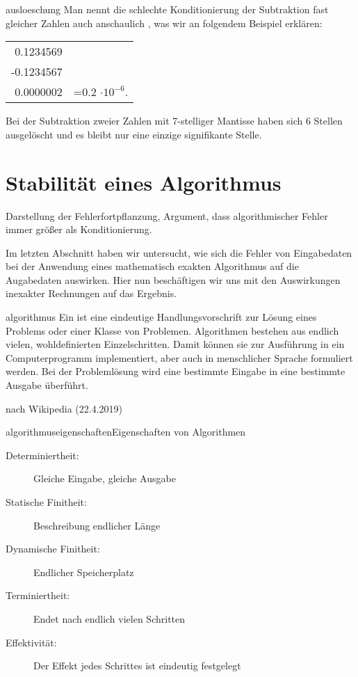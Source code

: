 \begin{Bemerkung}{ausloeschung}
  Man nennt die schlechte Konditionierung der Subtraktion fast
  gleicher Zahlen auch anschaulich , was wir an
  folgendem Beispiel erklären:
  \begin{center}
    \begin{tabular}{r@{}l}
      0.1234569&\\
      -0.1234567&\\\hline
      0.0000002&=0.2 $\cdot 10^{-6}$.
    \end{tabular}
  \end{center}
  Bei der Subtraktion zweier Zahlen mit 7-stelliger Mantisse haben
  sich 6 Stellen ausgelöscht und es bleibt nur eine einzige
  signifikante Stelle.
\end{Bemerkung}

\section{Stabilität eines Algorithmus}

\begin{todo}
  Darstellung der Fehlerfortpflanzung, Argument, dass algorithmischer
  Fehler immer größer als Konditionierung.
\end{todo}
\begin{intro}
  Im letzten Abschnitt haben wir untersucht, wie sich die Fehler von
  Eingabedaten bei der Anwendung eines mathematisch exakten
  Algorithmus auf die Augabedaten auswirken. Hier nun beschäftigen wir
  uns mit den Auswirkungen inexakter Rechnungen auf das Ergebnis.
\end{intro}

\begin{Definition}{algorithmus}
  Ein  ist eine eindeutige Handlungsvorschrift zur Lösung
  eines Problems oder einer Klasse von Problemen. Algorithmen bestehen
  aus endlich vielen, wohldefinierten Einzelschritten. Damit können
  sie zur Ausführung in ein Computerprogramm implementiert, aber auch
  in menschlicher Sprache formuliert werden. Bei der Problemlösung
  wird eine bestimmte Eingabe in eine bestimmte Ausgabe überführt.

  \hfill nach Wikipedia (22.4.2019)
\end{Definition}

\begin{Bemerkung*}{algorithmuseigenschaften}{Eigenschaften von Algorithmen}
  \begin{description}
  \item[Determiniertheit:] Gleiche Eingabe, gleiche Ausgabe
  \item[Statische Finitheit:] Beschreibung endlicher Länge
  \item[Dynamische Finitheit:] Endlicher Speicherplatz
  \item[Terminiertheit:] Endet nach endlich vielen Schritten
  \item[Effektivität:] Der Effekt jedes Schrittes ist eindeutig festgelegt
  \end{description}
\end{Bemerkung*}

